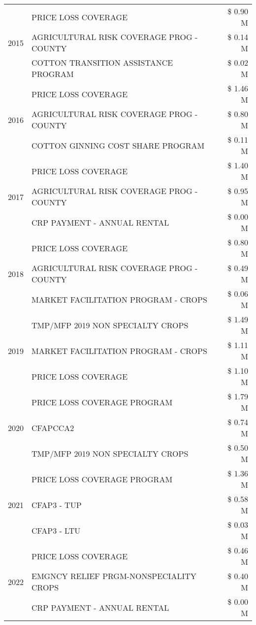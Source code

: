 \begin{tabular}{llr}
\cline{1-3}
\multirow[t]{3}{*}{2015} & PRICE LOSS COVERAGE & \$ 0.90 M \\
 & AGRICULTURAL RISK COVERAGE PROG - COUNTY & \$ 0.14 M \\
 & COTTON TRANSITION ASSISTANCE PROGRAM & \$ 0.02 M \\
\cline{1-3}
\multirow[t]{3}{*}{2016} & PRICE LOSS COVERAGE & \$ 1.46 M \\
 & AGRICULTURAL RISK COVERAGE PROG - COUNTY & \$ 0.80 M \\
 & COTTON GINNING COST SHARE PROGRAM & \$ 0.11 M \\
\cline{1-3}
\multirow[t]{3}{*}{2017} & PRICE LOSS COVERAGE & \$ 1.40 M \\
 & AGRICULTURAL RISK COVERAGE PROG - COUNTY & \$ 0.95 M \\
 & CRP PAYMENT - ANNUAL RENTAL & \$ 0.00 M \\
\cline{1-3}
\multirow[t]{3}{*}{2018} & PRICE LOSS COVERAGE & \$ 0.80 M \\
 & AGRICULTURAL RISK COVERAGE PROG - COUNTY & \$ 0.49 M \\
 & MARKET FACILITATION PROGRAM - CROPS & \$ 0.06 M \\
\cline{1-3}
\multirow[t]{3}{*}{2019} & TMP/MFP 2019 NON SPECIALTY CROPS & \$ 1.49 M \\
 & MARKET FACILITATION PROGRAM - CROPS & \$ 1.11 M \\
 & PRICE LOSS COVERAGE & \$ 1.10 M \\
\cline{1-3}
\multirow[t]{3}{*}{2020} & PRICE LOSS COVERAGE PROGRAM & \$ 1.79 M \\
 & CFAPCCA2 & \$ 0.74 M \\
 & TMP/MFP 2019 NON SPECIALTY CROPS & \$ 0.50 M \\
\cline{1-3}
\multirow[t]{3}{*}{2021} & PRICE LOSS COVERAGE PROGRAM & \$ 1.36 M \\
 & CFAP3 - TUP & \$ 0.58 M \\
 & CFAP3 - LTU & \$ 0.03 M \\
\cline{1-3}
\multirow[t]{3}{*}{2022} & PRICE LOSS COVERAGE & \$ 0.46 M \\
 & EMGNCY RELIEF PRGM-NONSPECIALITY CROPS & \$ 0.40 M \\
 & CRP PAYMENT - ANNUAL RENTAL & \$ 0.00 M \\
\cline{1-3}
\bottomrule
\end{tabular}
